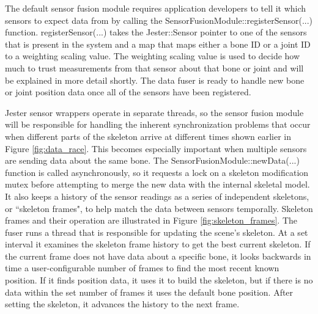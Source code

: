 The default sensor fusion module requires application developers to tell it which sensors to expect data from by calling the \mbox{SensorFusionModule::registerSensor(...)} function. registerSensor(...) takes the Jester::Sensor pointer to one of the sensors that is present in the system and a map that maps either a bone ID or a joint ID to a weighting scaling value. The weighting scaling value is used to decide how much to trust measurements from that sensor about that bone or joint and will be explained in more detail shortly. The data fuser is ready to handle new bone or joint position data once all of the sensors have been registered.

Jester sensor wrappers operate in separate threads, so the sensor fusion module will be responsible for handling the inherent synchronization problems that occur when different parts of the skeleton arrive at different times shown earlier in Figure \ref{fig:data_race}. This becomes especially important when multiple sensors are sending data about the same bone. The \mbox{SensorFusionModule::newData(...)} function is called asynchronously, so it requests a lock on a skeleton modification mutex before attempting to merge the new data with the internal skeletal model. It also keeps a history of the sensor readings as a series of independent skeletons, or ``skeleton frames", to help match the data between sensors temporally. Skeleton frames and their operation are illustrated in Figure \ref{fig:skeleton_frames}. The fuser runs a thread that is responsible for updating the scene's skeleton. At a set interval it examines the skeleton frame history to get the best current skeleton. If the current frame does not have data about a specific bone, it looks backwards in time a user-configurable number of frames to find the most recent known position. If it finds position data, it uses it to build the skeleton, but if there is no data within the set number of frames it uses the default bone position. After setting the skeleton, it advances the history to the next frame. 


